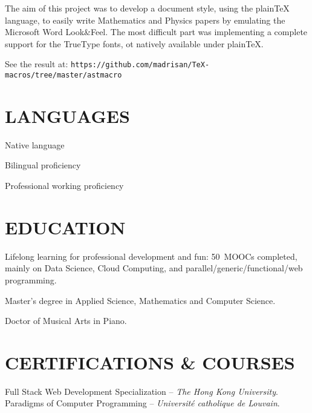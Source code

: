 The aim of this project was to develop a document style, using the plainTeX language, 
to easily write Mathematics and Physics papers by emulating the Microsoft Word 
Look\&Feel.
The most difficult part was implementing a complete support for the TrueType fonts,
ot natively available under plain\TeX.

See the result at:
\hfill\break\noindent
{\tt https:/\negthinspace/github.com/madrisan/TeX-macros/tree/master/astmacro}


\section{LANGUAGES}

Native language

Bilingual proficiency

Professional working proficiency


\section{EDUCATION}

\vskip -6pt

Lifelong learning for professional development and fun:
50\smallplus~MOOCs completed, mainly on Data Science, Cloud Computing,
and parallel/generic/functional/web programming.


Master's degree in Applied Science, Mathematics and Computer Science.


Doctor of Musical Arts in Piano.


\section{CERTIFICATIONS \& COURSES}

  {Full Stack Web Development Specialization -- {\it The Hong Kong University}.}
  {Paradigms of Computer Programming -- {\it Universit\'e catholique de Louvain}.}

